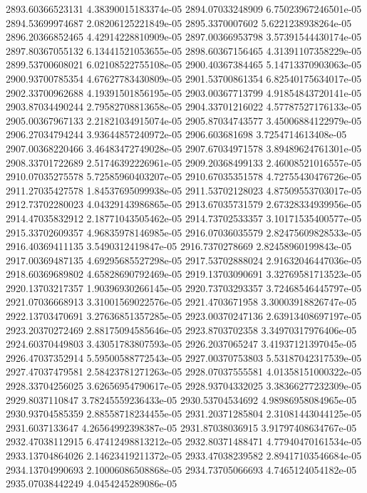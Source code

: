 {2893.60366523131 4.38390015183374e-05
2894.07033248909 6.75023967246501e-05
2894.53699974687 2.08206125221849e-05
2895.3370007602 5.6221238938264e-05
2896.20366852465 4.42914228810909e-05
2897.00366953798 3.57391544430174e-05
2897.80367055132 6.13441521053655e-05
2898.60367156465 4.31391107358229e-05
2899.53700608021 6.02108522755108e-05
2900.40367384465 5.14713370903063e-05
2900.93700785354 4.67627783430809e-05
2901.53700861354 6.82540175634017e-05
2902.33700962688 4.19391501856195e-05
2903.00367713799 4.91854843720141e-05
2903.87034490244 2.79582708813658e-05
2904.33701216022 4.57787527176133e-05
2905.00367967133 2.21821034915074e-05
2905.87034743577 3.45006884122979e-05
2906.27034794244 3.93644857240972e-05
2906.603681698 3.7254714613408e-05
2907.00368220466 3.46483472749028e-05
2907.67034971578 3.89489624761301e-05
2908.33701722689 2.51746392226961e-05
2909.20368499133 2.46008521016557e-05
2910.07035275578 5.72585960403207e-05
2910.67035351578 4.72755430476726e-05
2911.27035427578 1.84537695099938e-05
2911.53702128023 4.87509553703017e-05
2912.73702280023 4.04329143986865e-05
2913.67035731579 2.67328334939956e-05
2914.47035832912 2.18771043505462e-05
2914.73702533357 3.10171535400577e-05
2915.33702609357 4.96835978146985e-05
2916.07036035579 2.82475609828533e-05
2916.40369411135 3.5490312419847e-05
2916.7370278669 2.82458960199843e-05
2917.00369487135 4.69295685527298e-05
2917.53702888024 2.91632046447036e-05
2918.60369689802 4.65828690792469e-05
2919.13703090691 3.32769581713523e-05
2920.13703217357 1.90396930266145e-05
2920.73703293357 3.72468546445797e-05
2921.07036668913 3.31001569022576e-05
2921.4703671958 3.30003918826747e-05
2922.13703470691 3.27636851357285e-05
2923.00370247136 2.63913408697197e-05
2923.20370272469 2.88175094585646e-05
2923.8703702358 3.34970317976406e-05
2924.60370449803 3.43051783807593e-05
2926.2037065247 3.41937121397045e-05
2926.47037352914 5.59500588772543e-05
2927.00370753803 5.53187042317539e-05
2927.47037479581 2.58423781271263e-05
2928.07037555581 4.01358151000322e-05
2928.33704256025 3.62656954790617e-05
2928.93704332025 3.38366277232309e-05
2929.8037110847 3.78245559236433e-05
2930.53704534692 4.98986958084965e-05
2930.93704585359 2.88558718234455e-05
2931.20371285804 2.31081443044125e-05
2931.6037133647 4.26564992398387e-05
2931.87038036915 3.91797408634767e-05
2932.47038112915 6.47412498813212e-05
2932.80371488471 4.77940470161534e-05
2933.13704864026 2.14623419211372e-05
2933.47038239582 2.89417103546684e-05
2934.13704990693 2.10006086508868e-05
2934.73705066693 4.7465124054182e-05
2935.07038442249 4.0454245289086e-05
}
